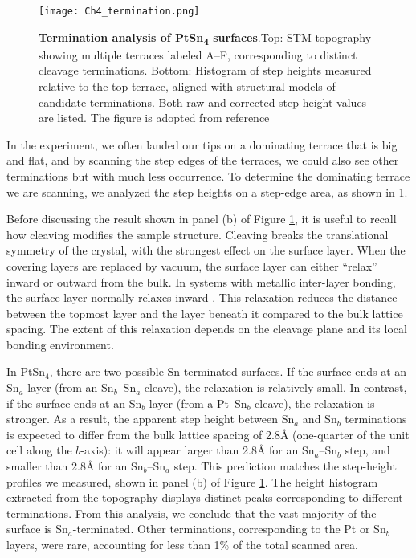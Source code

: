 \begin{figure}
	\centering
	\texttt{[image: Ch4\_termination.png]}
	\caption[\textbf{Termination analysis of PtSn\textsubscript{4} surfaces}]{\textbf{Termination analysis of PtSn\textsubscript{4} surfaces}.Top: STM topography showing multiple terraces labeled A–F, corresponding to distinct cleavage terminations.
	Bottom: Histogram of step heights measured relative to the top terrace, aligned with structural models of candidate terminations. Both raw and corrected step-height values are listed. The figure is adopted from reference \cite{warnerDefectTerraceCharacterization2022}}
	\label{fig:ch4_termination}
\end{figure}

\par In the experiment, we often landed our tips on a dominating terrace that is big and flat, and by scanning the step edges of the terraces, we could also see other terminations but with much less occurrence. To determine the dominating terrace we are scanning, we analyzed the step heights on a step-edge area, as shown in \ref{fig:ch4_termination}. 

Before discussing the result shown in panel (b) of Figure \ref{fig:ch4_termination}, it is useful to recall how cleaving modifies the sample structure. Cleaving breaks the translational symmetry of the crystal, with the strongest effect on the surface layer. When the covering layers are replaced by vacuum, the surface layer can either “relax” inward or outward from the bulk. In systems with metallic inter-layer bonding, the surface layer normally relaxes inward \cite{okazawaEnhancedCorrelatedThermal2005}. This relaxation reduces the distance between the topmost layer and the layer beneath it compared to the bulk lattice spacing. The extent of this relaxation depends on the cleavage plane and its local bonding environment.

In PtSn$_4$, there are two possible Sn-terminated surfaces. If the surface ends at an Sn$_a$ layer (from an Sn$_b$–Sn$_a$ cleave), the relaxation is relatively small. In contrast, if the surface ends at an Sn$_b$ layer (from a Pt–Sn$_b$ cleave), the relaxation is stronger. As a result, the apparent step height between Sn$_a$ and Sn$_b$ terminations is expected to differ from the bulk lattice spacing of 2.8{\AA} (one-quarter of the unit cell along the $b$-axis): it will appear larger than 2.8{\AA} for an Sn$_a$–Sn$_b$ step, and smaller than 2.8{\AA} for an Sn$_b$–Sn$_a$ step. This prediction matches the step-height profiles we measured, shown in panel (b) of Figure \ref{fig:ch4_termination}. The height histogram extracted from the topography displays distinct peaks corresponding to different terminations. From this analysis, we conclude that the vast majority of the surface is Sn$_a$-terminated. Other terminations, corresponding to the Pt or Sn$_b$ layers, were rare, accounting for less than 1\% of the total scanned area.


